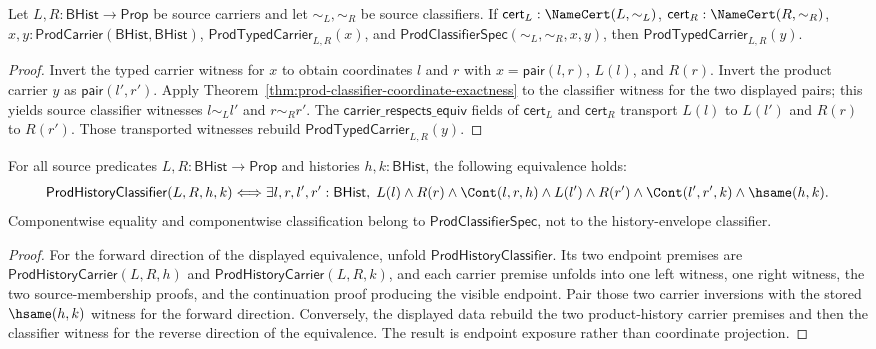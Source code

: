 \begin{theorem}
\label{thm:product-typed-carrier-transport-source-certificates}
Let $L,R:\mathsf{BHist}\to\mathsf{Prop}$ be source carriers and let
$\sim_L,\sim_R$ be source classifiers. If
$\mathsf{cert}_L:\NameCert(L,\sim_L)$,
$\mathsf{cert}_R:\NameCert(R,\sim_R)$,
$x,y:\mathsf{ProdCarrier}(\mathsf{BHist},\mathsf{BHist})$,
$\mathsf{ProdTypedCarrier}_{L,R}(x)$, and
$\mathsf{ProdClassifierSpec}(\sim_L,\sim_R,x,y)$, then
$\mathsf{ProdTypedCarrier}_{L,R}(y)$.
\end{theorem}
\begin{proof}
Invert the typed carrier witness for $x$ to obtain coordinates $l$ and $r$
with $x=\mathsf{pair}(l,r)$, $L(l)$, and $R(r)$. Invert the product carrier
$y$ as $\mathsf{pair}(l',r')$. Apply
Theorem~\ref{thm:prod-classifier-coordinate-exactness} to the classifier
witness for the two displayed pairs; this yields source classifier witnesses
$l\sim_L l'$ and $r\sim_R r'$. The
$\mathsf{carrier\_respects\_equiv}$ fields of $\mathsf{cert}_L$ and
$\mathsf{cert}_R$ transport $L(l)$ to $L(l')$ and $R(r)$ to $R(r')$.
Those transported witnesses rebuild $\mathsf{ProdTypedCarrier}_{L,R}(y)$.
\end{proof}

\begin{theorem}
\label{thm:prod-history-classifier-component-inversion}
For all source predicates $L,R:\mathsf{BHist}\to\mathsf{Prop}$ and histories
$h,k:\mathsf{BHist}$, the following equivalence holds:
$$
\mathsf{ProdHistoryClassifier}(L,R,h,k)
\Longleftrightarrow
\exists l,r,l',r':\mathsf{BHist},\;
L(l)\land R(r)\land \Cont(l,r,h)\land
L(l')\land R(r')\land \Cont(l',r',k)\land \hsame(h,k).
$$
Componentwise equality and componentwise classification belong to
$\mathsf{ProdClassifierSpec}$, not to the history-envelope classifier.
\end{theorem}
\begin{proof}
For the forward direction of the displayed equivalence, unfold
$\mathsf{ProdHistoryClassifier}$. Its two endpoint premises are
$\mathsf{ProdHistoryCarrier}(L,R,h)$ and
$\mathsf{ProdHistoryCarrier}(L,R,k)$, and each carrier premise unfolds into
one left witness, one right witness, the two source-membership proofs, and the
continuation proof producing the visible endpoint. Pair those two carrier
inversions with the stored $\hsame(h,k)$ witness for the forward direction.
Conversely, the displayed data rebuild the two product-history carrier
premises and then the classifier witness for the reverse direction of the
equivalence. The result is endpoint exposure rather than coordinate
projection.
\end{proof}

